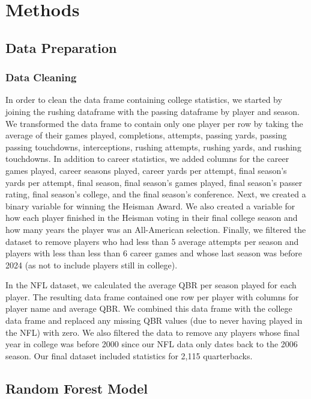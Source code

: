 \documentclass{article}
\begin{document}
\section{Methods}
\label{sec:methods}

\subsection{Data Preparation}

\subsubsection{Data Cleaning}

In order to clean the data frame containing college statistics, we started by joining the rushing dataframe with the passing dataframe by player and season. We transformed the data frame to contain only one player per row by taking the average of their games played, completions, attempts, passing yards, passing passing touchdowns, interceptions, rushing attempts, rushing yards, and rushing touchdowns. In addition to career statistics, we added columns for the career games played, career seasons played, career yards per attempt, final season's yards per attempt, final season, final season's games played, final season's passer rating, final season's college, and the final season's conference.  Next, we created a binary variable for winning the Heisman Award. We also created a variable for how each player finished in the Heisman voting in their final college season and how many years the player was an All-American selection. Finally, we filtered the dataset to remove players who had less than 5 average attempts per season and players with less than less than 6 career games and whose last season was before 2024 (as not to include players still in college).

In the NFL dataset, we calculated the average QBR per season played for each player. The resulting data frame contained one row per player with columns for player name and average QBR. We combined this data frame with the college data frame and replaced any missing QBR values (due to never having played in the NFL) with zero. We also filtered the data to remove any players whose final year in college was before 2000 since our NFL data only dates back to the 2006 season. Our final dataset included statistics for 2,115 quarterbacks.

\subsection{Random Forest Model}
\end{document}
